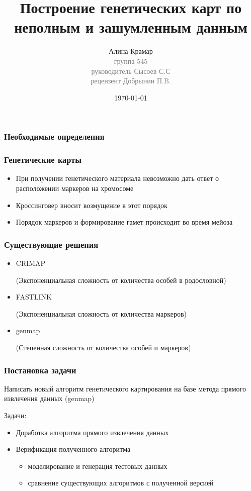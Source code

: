 \documentclass{beamer}
\title{Построение генетических карт по неполным и
зашумленным данным}
\author{Алина Крамар\\
  { \footnotesize \textcolor{gray}{группа 545\\ руководитель Сысоев
      С.С\\ рецензент Добрынин П.B.}}}
\institute{Санкт-Петербургский государственный университет}
\date{\today}
\begin{document}
\begin{frame}
\titlepage
\end{frame}


\begin{frame}
  \frametitle{Необходимые определения}

\end{frame}

\begin{frame}
  \frametitle{Генетические карты}
  \begin{itemize}
    \item При получении генетического материала невозможно дать ответ
      о расположении маркеров на хромосоме
    \item Кроссинговер вносит возмущение в этот порядок
    \item Порядок маркеров и формирование гамет происходит во время мейоза
  \end{itemize}
\end{frame}

\begin{frame}
  \frametitle{Существующие решения}
  \begin{itemize}
      \item CRIMAP

        (Экспоненциальная сложность от количества особей в родословной)
      \item FASTLINK

        (Экспоненциальная сложность от количества маркеров)
      \item genmap

        (Степенная сложность от количества особей и маркеров)
  \end{itemize}
\end{frame}

\begin{frame}
  \frametitle{Постановка задачи}
  Написать новый алгоритм генетического картирования на базе метода
  прямого извлечения данных (genmap)

  \medskip

  Задачи:
  \begin{itemize}
  \item Доработка алгоритма прямого извлечения данных
  \item Верификация полученного алгоритма
    \begin{itemize}
      \item моделирование и генерация тестовых данных
      \item сравнение существующих алгоритмов с полученной версией
    \end{itemize}
  \end{itemize}
\end{frame}
\end{document}
